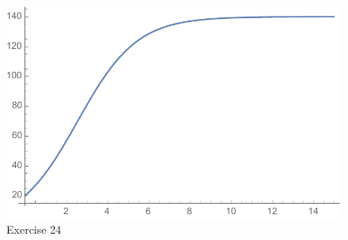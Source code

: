 \documentclass[letterpaper, landscape]{exam}
\begin{document}
\begin{description}
      \begin{figure}[H]
        \centering
        \includegraphics[scale = 0.5]{ex24}
        \caption{Exercise 24}
        \label{fig:ex24}
      \end{figure}









\end{description}
\end{document}
